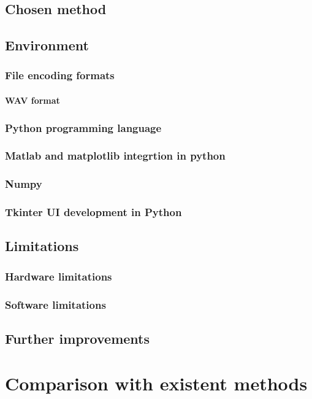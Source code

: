 \documentclass[12pt]{report}
\begin{document}
\section{Chosen method}
\section{Environment}
\subsection{File encoding formats}
\subsubsection{WAV format}
\subsection{Python programming language}
\subsection{Matlab and matplotlib integrtion in python}
\subsection{Numpy}
\subsection{Tkinter UI development in Python}


\section{Limitations}
\subsection{Hardware limitations}
\subsection{Software limitations}

\section{Further improvements}

\chapter{Comparison with existent methods}
\end{document}
